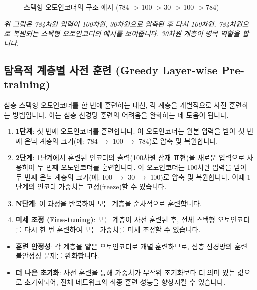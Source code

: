 \documentclass[11pt,a4paper]{article}
\theoremstyle{definition}
\begin{document}
\begin{figure}[h!]
\centering
\caption{스택형 오토인코더의 구조 예시 (784 -> 100 -> 30 -> 100 -> 784)}
\label{fig:stacked_autoencoder_structure}
\end{figure}
\textit{위 그림은 784차원 입력이 100차원, 30차원으로 압축된 후 다시 100차원, 784차원으로 복원되는 스택형 오토인코더의 예시를 보여줍니다. 30차원 계층이 병목 역할을 합니다.}

\subsection{탐욕적 계층별 사전 훈련 (Greedy Layer-wise Pre-training)}
심층 스택형 오토인코더를 한 번에 훈련하는 대신, 각 계층을 개별적으로 사전 훈련하는 방법입니다. 이는 심층 신경망 훈련의 어려움을 완화하는 데 도움이 됩니다.

\begin{enumerate}
    \item \textbf{1단계}: 첫 번째 오토인코더를 훈련합니다. 이 오토인코더는 원본 입력을 받아 첫 번째 은닉 계층의 크기(예: 784 $\rightarrow$ 100 $\rightarrow$ 784)로 압축 및 복원합니다.
    \item \textbf{2단계}: 1단계에서 훈련된 인코더의 출력(100차원 잠재 표현)을 새로운 입력으로 사용하여 두 번째 오토인코더를 훈련합니다. 이 오토인코더는 100차원 입력을 받아 두 번째 은닉 계층의 크기(예: 100 $\rightarrow$ 30 $\rightarrow$ 100)로 압축 및 복원합니다. 이때 1단계의 인코더 가중치는 고정(freeze)할 수 있습니다.
    \item \textbf{N단계}: 이 과정을 반복하여 모든 계층을 순차적으로 훈련합니다.
    \item \textbf{미세 조정 (Fine-tuning)}: 모든 계층이 사전 훈련된 후, 전체 스택형 오토인코더를 다시 한 번 훈련하여 모든 가중치를 미세 조정할 수 있습니다.
\end{enumerate}

\begin{infobox}
\begin{itemize}
    \item \textbf{훈련 안정성}: 각 계층을 얕은 오토인코더로 개별 훈련하므로, 심층 신경망의 훈련 불안정성 문제를 완화합니다.
    \item \textbf{더 나은 초기화}: 사전 훈련을 통해 가중치가 무작위 초기화보다 더 의미 있는 값으로 초기화되어, 전체 네트워크의 최종 훈련 성능을 향상시킬 수 있습니다.
\end{itemize}
\end{infobox}
\end{document}
